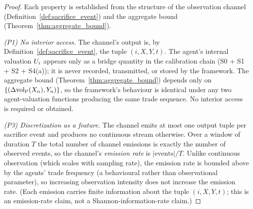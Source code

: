 \begin{proof}
Each property is established from the structure of the observation
channel (Definition~\ref{def:sacrifice_event}) and the aggregate
bound (Theorem~\ref{thm:aggregate_bound}).

\emph{(P1) No interior access.}
The channel's output is, by Definition~\ref{def:sacrifice_event},
the tuple $(i, X, Y, t)$.  The agent's internal valuation $U_i$
appears only as a bridge quantity in the calibration chain
(S0 + S1 + S2 + S4(a)); it is never recorded, transmitted, or
stored by the framework.  The aggregate bound
(Theorem~\ref{thm:aggregate_bound}) depends only on
$\{(\Delta{\operatorname{vol}_{\mathrm{P}}}(X_n), Y_n)\}$, so the framework's behaviour is
identical under any two agent-valuation functions producing the
same trade sequence.  No interior access is required or obtained.

\emph{(P3) Discretization as a feature.}
The channel emits at most one output tuple per sacrifice event
and produces no continuous stream otherwise.  Over a window of
duration $T$ the total number of channel emissions is exactly
the number of observed events, so the channel's \emph{emission
rate} is $|\mathrm{events}|/T$.  Unlike continuous observation
(which scales with sampling rate), the emission rate is bounded
above by the agents' trade frequency (a behavioural rather than
observational parameter), so increasing observation intensity
does not increase the emission rate.  (Each emission carries
finite information about the tuple $(i, X, Y, t)$; this is an
emission-rate claim, not a Shannon-information-rate claim.)


\end{proof}
